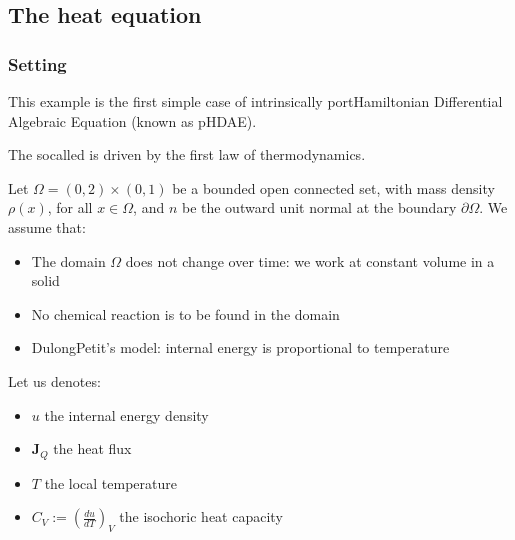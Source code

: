 \documentclass[letterpaper,10pt,english]{sphinxmanual}
\begin{document}
\noindent{}

\sphinxstepscope


\subsection{The heat equation}
\label{\detokenize{examples/heat:the-heat-equation}}\label{\detokenize{examples/heat::doc}}

\subsubsection{Setting}
\label{\detokenize{examples/heat:setting}}\label{\detokenize{examples/heat:heat-2d}}
\sphinxAtStartPar
This example is the first simple case of intrinsically port\sphinxhyphen{}Hamiltonian
Differential Algebraic Equation (known as pH\sphinxhyphen{}DAE).

\sphinxAtStartPar
The so\sphinxhyphen{}called  is driven by the first law of
thermodynamics.

\sphinxAtStartPar
Let \(\Omega = (0,2) \times (0,1)\) be a bounded open connected set,
with mass density \(\rho(x)\), for all \(x \in \Omega\), and
\(n\) be the outward unit normal at the boundary
\(\partial\Omega\). We assume that:
\begin{itemize}
\item {} 
\sphinxAtStartPar
The domain \(\Omega\) does not change over time:  we work
at constant volume in a solid

\item {} 
\sphinxAtStartPar
No chemical reaction is to be found in the domain

\item {} 
\sphinxAtStartPar
Dulong\sphinxhyphen{}Petit’s model: internal energy is proportional to temperature

\end{itemize}

\sphinxAtStartPar
Let us denotes:
\begin{itemize}
\item {} 
\sphinxAtStartPar
\(u\) the internal energy density

\item {} 
\sphinxAtStartPar
\(\mathbf{J}_Q\) the heat flux

\item {} 
\sphinxAtStartPar
\(T\) the local temperature

\item {} 
\sphinxAtStartPar
\(C_V := \left( \frac{d u}{d T} \right)_V\) the isochoric heat
capacity

\end{itemize}
\end{document}

